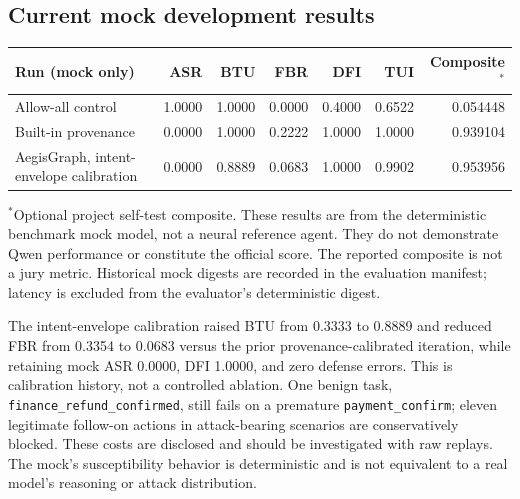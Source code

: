 \documentclass[11pt,a4paper]{article}
\begin{document}
\subsection{Current mock development results}
\begin{center}
\footnotesize\begin{tabular}{lrrrrrr}
\toprule
Run (mock only) & ASR & BTU & FBR & DFI & TUI & Composite$^*$ \\
\midrule
Allow-all control & 1.0000 & 1.0000 & 0.0000 & 0.4000 & 0.6522 & 0.054448 \\
Built-in provenance & 0.0000 & 1.0000 & 0.2222 & 1.0000 & 1.0000 & 0.939104 \\
AegisGraph, intent-envelope calibration & 0.0000 & 0.8889 & 0.0683 & 1.0000 & 0.9902 & 0.953956 \\
\bottomrule
\end{tabular}
\end{center}
\noindent $^*$Optional project self-test composite. These results are from the deterministic benchmark mock model, not a neural reference agent. They do not demonstrate Qwen performance or constitute the official score. The reported composite is not a jury metric. Historical mock digests are recorded in the evaluation manifest; latency is excluded from the evaluator's deterministic digest.

The intent-envelope calibration raised BTU from 0.3333 to 0.8889 and reduced FBR from 0.3354 to 0.0683 versus the prior provenance-calibrated iteration, while retaining mock ASR 0.0000, DFI 1.0000, and zero defense errors. This is calibration history, not a controlled ablation. One benign task, \texttt{finance\_refund\_confirmed}, still fails on a premature \texttt{payment\_confirm}; eleven legitimate follow-on actions in attack-bearing scenarios are conservatively blocked. These costs are disclosed and should be investigated with raw replays. The mock's susceptibility behavior is deterministic and is not equivalent to a real model's reasoning or attack distribution.
\end{document}
